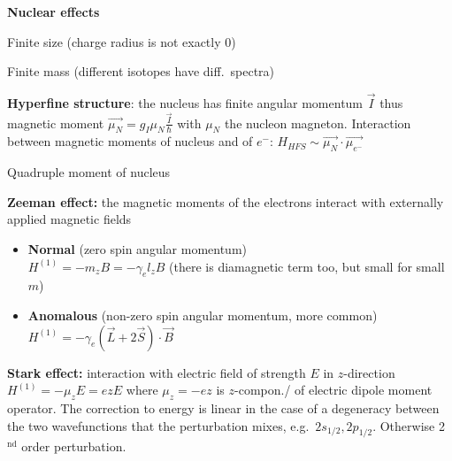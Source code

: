 \squishline

\textbf{Nuclear effects}
\begin{squishlist}
    \item Finite size (charge radius is not exactly 0)
    \item Finite mass (different isotopes have diff.\ spectra)
    \item \textbf{Hyperfine structure}: the nucleus has finite angular momentum $\vec{I}$ thus magnetic moment $\vec{\mu_N} = g_I \mu_N \frac{\vec{I}}{\hbar}$ with $\mu_N$ the nucleon magneton.
    Interaction between magnetic moments of nucleus and of $e^-$:
    $H_{HFS} \sim \vec{\mu_N}\cdot \vec{\mu_{e^-}}$
    \item Quadruple moment of nucleus
\end{squishlist}

\begin{squishlist}
    \item \textbf{Zeeman effect:} the magnetic moments of the electrons interact with externally applied magnetic fields
    \begin{itemize}
        \item \textbf{Normal} (zero spin angular momentum) \\
        $H^{(1)} = - m_z B = -\gamma_e l_z B$ (there is diamagnetic term too, but small for small $m$)
        \item \textbf{Anomalous} (non-zero spin angular momentum, more common) \\
        $H^{(1)} = -\gamma_e (\vec{L} + 2\vec{S}) \cdot \vec{B}$
    \end{itemize}

    \item \textbf{Stark effect:} interaction with electric field of strength $E$ in $z$-direction \\
    $H^{(1)} = - \mu_z E = e z E$ where $\mu_z = -e z$ is $z$-compon./ of electric dipole moment operator.
    The correction to energy is linear in the case of a degeneracy between the two wavefunctions that the perturbation mixes, e.g.\ $2s_{1/2}, 2p_{1/2}$. Otherwise 2$^{\text{nd}}$ order perturbation.
\end{squishlist}


